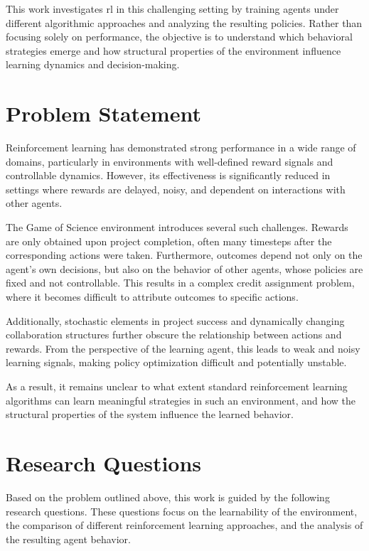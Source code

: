 \documentclass[english,bachelor]{hsluthesis}
\begin{document}
This work investigates \gls{rl} in this challenging setting by training agents under different algorithmic approaches and analyzing the resulting policies. Rather than focusing solely on performance, the objective is to understand which behavioral strategies emerge and how structural properties of the environment influence learning dynamics and decision-making.

\section{Problem Statement}
Reinforcement learning has demonstrated strong performance in a wide range of domains, particularly in environments with well-defined reward signals and controllable dynamics. However, its effectiveness is significantly reduced in settings where rewards are delayed, noisy, and dependent on interactions with other agents.

The Game of Science environment introduces several such challenges. Rewards are only obtained upon project completion, often many timesteps after the corresponding actions were taken. Furthermore, outcomes depend not only on the agent's own decisions, but also on the behavior of other agents, whose policies are fixed and not controllable. This results in a complex credit assignment problem, where it becomes difficult to attribute outcomes to specific actions.

Additionally, stochastic elements in project success and dynamically changing collaboration structures further obscure the relationship between actions and rewards. From the perspective of the learning agent, this leads to weak and noisy learning signals, making policy optimization difficult and potentially unstable.

As a result, it remains unclear to what extent standard reinforcement learning algorithms can learn meaningful strategies in such an environment, and how the structural properties of the system influence the learned behavior.

\section{Research Questions}
Based on the problem outlined above, this work is guided by the following research questions. These questions focus on the learnability of the environment, the comparison of different reinforcement learning approaches, and the analysis of the resulting agent behavior.
\end{document}
